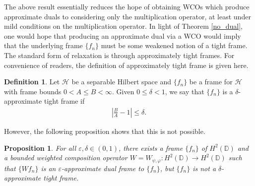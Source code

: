 \documentclass{amsart}
\newtheorem{prop}[thm]{Proposition}
\theoremstyle{definition}
\newtheorem{definition}[thm]{Definition}
\theoremstyle{remark}
\numberwithin{equation}{section}
\begin{document}
The above result essentially reduces the hope of obtaining WCOs which produce approximate duals to considering only the multiplication operator, at least under mild conditions on the multiplication operator. In light of Theorem \ref{no_dual}, one would hope that producing an approximate dual via a WCO would imply that the underlying frame $\{f_{n}\}$ must be some weakened notion of a tight frame. The standard form of relaxation is through approximately tight frames. For convenience of readers, the definition of approximately tight frame is given here.
\begin{definition}
    Let $\mathcal{H}$ be a separable Hilbert space and $\{f_{n}\}$ be a frame for $\mathcal{H}$ with frame bounds $0<A\leq B<\infty$. Given $0\leq\delta<1$, we say that $\{f_{n}\}$ is a $\delta$-approximate tight frame if 
    \begin{align*}
        \left|\frac{B}{A}-1\right| \leq \delta. 
    \end{align*}
\end{definition}

However, the following proposition shows that this is not possible. 



\begin{prop}\label{thm:hardy_approximate_dual}
    For all $\varepsilon, \delta \in (0,1)$, there exists a frame $\{f_{n}\}$ of $H^{2}(\mathbb{D})$ and a bounded weighted composition operator $W=W_{\psi,\varphi}:H^{2}(\mathbb{D})\to H^{2}(\mathbb{D})$ such that $\{Wf_{n}\}$ is an $\varepsilon$-approximate dual frame to $\{f_{n}\}$, but $\{f_{n}\}$ is not a $\delta$-approximate tight frame.
\end{prop}
\end{document}
